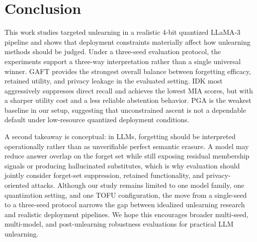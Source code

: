 \documentclass[conference]{IEEEtran}
\begin{document}
\section{Conclusion}
This work studies targeted unlearning in a realistic 4-bit quantized LLaMA-3 pipeline and shows that deployment constraints materially affect how unlearning methods should be judged. Under a three-seed evaluation protocol, the experiments support a three-way interpretation rather than a single universal winner. GAFT provides the strongest overall balance between forgetting efficacy, retained utility, and privacy leakage in the evaluated setting. IDK most aggressively suppresses direct recall and achieves the lowest MIA scores, but with a sharper utility cost and a less reliable abstention behavior. PGA is the weakest baseline in our setup, suggesting that unconstrained ascent is not a dependable default under low-resource quantized deployment conditions.

A second takeaway is conceptual: in LLMs, forgetting should be interpreted operationally rather than as unverifiable perfect semantic erasure. A model may reduce answer overlap on the forget set while still exposing residual membership signals or producing hallucinated substitutes, which is why evaluation should jointly consider forget-set suppression, retained functionality, and privacy-oriented attacks. Although our study remains limited to one model family, one quantization setting, and one TOFU configuration, the move from a single-seed to a three-seed protocol narrows the gap between idealized unlearning research and realistic deployment pipelines. We hope this encourages broader multi-seed, multi-model, and post-unlearning robustness evaluations for practical LLM unlearning.
\end{document}
